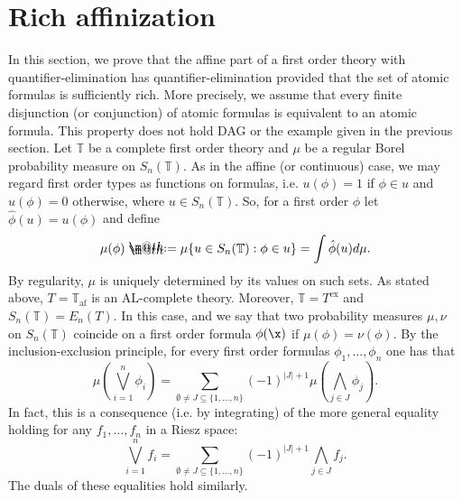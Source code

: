 \documentclass[12pt]{article}
\makeatletter
\newcommand*{\defeq}{\mathrel{\rlap{%
                     \raisebox{0.3ex}{$\m@th\cdot$}}%
                     \raisebox{-0.3ex}{$\m@th\cdot$}}%
                     =}
\makeatother
\begin{document}
\section{Rich affinization}
In this section, we prove that the affine part of a first order theory with quantifier-elimination
has quantifier-elimination provided that the set of atomic formulas is sufficiently rich.
More precisely, we assume that every finite disjunction (or conjunction) of atomic formulas is equivalent
to an atomic formula. This property does not hold DAG or the example given in the previous section.
Let $\mathbb{T}$ be a complete first order theory and $\mu$ be a regular Borel probability measure on
$S_n(\mathbb{T})$.
As in the affine (or continuous) case, we may regard first order types as functions on formulas,
i.e. $u(\phi)=1$ if $\phi\in u$ and $u(\phi)=0$ otherwise, where $u\in S_n(\mathbb{T})$.
So, for a first order $\phi$ let $\hat{\phi}(u)=u(\phi)$ and define
$$\mu(\phi)\defeq\mu\{u\in S_n(\mathbb{T}): \phi\in u\}=\int\hat\phi(u)d\mu.$$
By regularity, $\mu$ is uniquely determined by its values on such sets.
As stated above, $T=\mathbb{T}_{\textrm{af}}$ is an AL-complete theory.
Moreover, $\mathbb{T}=T^{\textrm{ex}}$ and $S_n(\mathbb{T})=E_n(T)$.
In this case, and we say that two probability measures $\mu,\nu$ on $S_n(\mathbb{T})$ coincide on a
first order formula $\phi(\x)$ if $\mu(\phi)=\nu(\phi)$. %
By the inclusion-exclusion principle, for every first order formulas $\phi_1,...,\phi_n$ one has that
$$\mu(\bigvee_{i=1}^n\phi_i)=\sum_{\emptyset\neq J\subseteq\{1,...,n\}}(-1)^{|J|+1}\mu(\bigwedge_{j\in J}\phi_j).$$
In fact, this is a consequence (i.e. by integrating) of the more general equality holding for any $f_1,...,f_n$ in a Riesz space:
$$\bigvee_{i=1}^nf_i=\sum_{\emptyset\neq J\subseteq\{1,...,n\}}(-1)^{|J|+1}\bigwedge_{j\in J}f_j.$$
The duals of these equalities hold similarly.
\end{document}
